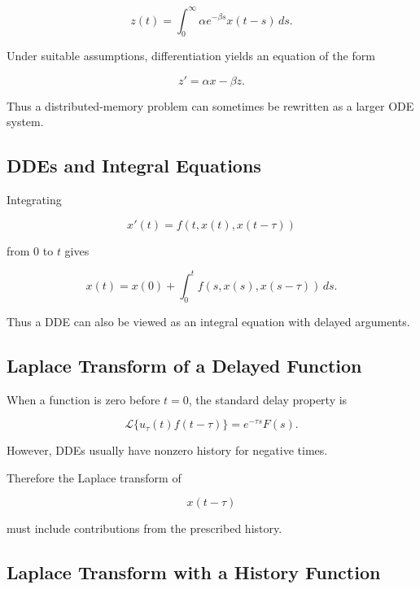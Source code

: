 \[
\boxed{
z(t)
=
\int_0^\infty
\alpha e^{-\beta s}
x(t-s)\,ds.
}
\]

Under suitable assumptions, differentiation yields an equation of the
form

\[
\boxed{
z'
=
\alpha x
-
\beta z.
}
\]

Thus a distributed-memory problem can sometimes be rewritten as a larger
ODE system.

\subsection{DDEs and Integral Equations}
\label{subsec:dde-integral-equation-connection}

Integrating

\[
x'(t)
=
f
\left(
t,
x(t),
x(t-\tau)
\right)
\]

from \(0\) to \(t\) gives

\[
\boxed{
x(t)
=
x(0)
+
\int_0^t
f
\left(
s,
x(s),
x(s-\tau)
\right)
\,ds.
}
\]

Thus a DDE can also be viewed as an integral equation with delayed
arguments.

\subsection{Laplace Transform of a Delayed Function}
\label{subsec:laplace-delayed-function-dde}

When a function is zero before \(t=0\), the standard delay property is

\[
\boxed{
\mathcal{L}
\{
u_\tau(t)f(t-\tau)
\}
=
e^{-\tau s}
F(s).
}
\]

However, DDEs usually have nonzero history for negative times.

Therefore the Laplace transform of

\[
x(t-\tau)
\]

must include contributions from the prescribed history.

\subsection{Laplace Transform with a History Function}
\label{subsec:laplace-history-function}

